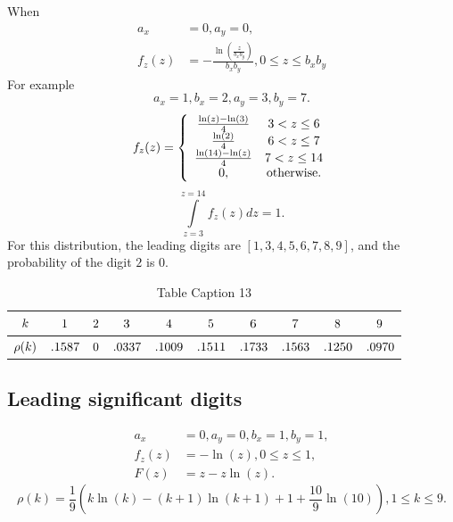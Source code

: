 \documentclass[titlepage,fleqn]{article}%
\begin{document}
When%
\begin{align*}
a_{x}  &  =0,a_{y}=0,\\
f_{z}(z)  &  =-\frac{\ln\left(  \frac{z}{b_{x}b_{y}}\right)  }{b_{x}b_{y}%
},0\leq z\leq b_{x}b_{y}%
\end{align*}
For example%
\[
a_{x}=1,b_{x}=2,a_{y}=3,b_{y}=7.
\]%
\[
f_{z}(z)=\left\{
\begin{array}
[c]{cc}%
\frac{\ln\left(  z\right)  -\ln\left(  3\right)  }{4} & 3<z\leq6\\
\frac{\ln(2)}{4} & 6<z\leq7\\
\frac{\ln(14)-\ln\left(  z\right)  }{4} & 7<z\leq14\\
0, & \text{otherwise.}%
\end{array}
\right.
\]%
\[%
{\displaystyle\int\limits_{z=3}^{z=14}}
f_{z}(z)dz=1.
\]
For this distribution, the leading digits are $[1,3,4,5,6,7,8,9]$, and the
probability of the digit $2$ is $0$.

\bigskip%

\begin{table}[!htbp] \centering
\begin{tabular}
[c]{|c|c|c|c|c|c|c|c|c|c|}\hline\hline
${\small k}$ & ${\small 1}$ & ${\small 2}$ & ${\small 3}$ & ${\small 4}$ &
${\small 5}$ & ${\small 6}$ & ${\small 7}$ & ${\small 8}$ & ${\small 9}%
$\\\hline
${\small \rho(k)}$ & ${\small .1587}$ & ${\small 0}$ & ${\small .0337}$ &
${\small .1009}$ & ${\small .1511}$ & ${\small .1733}$ & ${\small .1563}$ &
${\small .1250}$ & ${\small .0970}$\\\hline\hline
\end{tabular}
\caption{Table Caption 13}\label{TableKey13}%
\end{table}%


\subsection{Leading significant digits}%

\label{P2RNUDLSD}%
%

\begin{align*}
a_{x}  &  =0,a_{y}=0,b_{x}=1,b_{y}=1,\\
f_{z}(z)  &  =-\ln\left(  z\right)  ,0\leq z\leq1,\\
F(z)  &  =z-z\ln\left(  z\right)  .
\end{align*}%
\[
\rho(k)=\frac{1}{9}\left(  k\ln(k)-(k+1)\ln(k+1)+1+\frac{10}{9}\ln(10)\right)
,1\leq k\leq9.
\]
%
\end{document}
